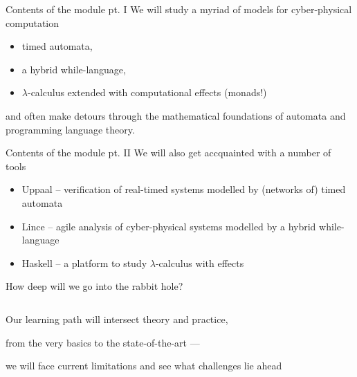 \documentclass[aspectratio=169]{beamer}
\begin{document}
\begin{frame}{Contents of the module pt. I}
  We will study a myriad of models for cyber-physical computation
  \begin{itemize}
  \item timed automata,
  \item a hybrid while-language,
  \item $\lambda$-calculus extended with computational effects (\alert{monads!})
  \end{itemize}

  \pause
  and often make detours through the \alert{mathematical
  foundations} of automata and programming language theory.
\end{frame}

\begin{frame}{Contents of the module pt. II}
  We will also get accquainted with a number of tools
  \begin{itemize}
  \item \alert{Uppaal} -- verification of real-timed systems modelled by (networks of) timed automata
  \item \alert{Lince} -- agile analysis of cyber-physical systems modelled by a hybrid
    while-language
  \item \alert{Haskell} -- a platform to study $\lambda$-calculus
    with effects
  \end{itemize}
\end{frame}

\begin{frame}{How deep will we go into the rabbit hole?}

  \begin{minipage}[1\textheight]{\textwidth}
  \begin{columns}[c]
  \begin{column}{0.8\textwidth}

    Our learning path will intersect theory and practice,
  
    from the very basics to the state-of-the-art ---

    we will face current limitations and see what challenges lie ahead 

  \end{column}
  \begin{column}{0.2\textwidth}
    
  \end{column}
  \end{columns}
  \end{minipage}

\end{frame}
\end{document}
